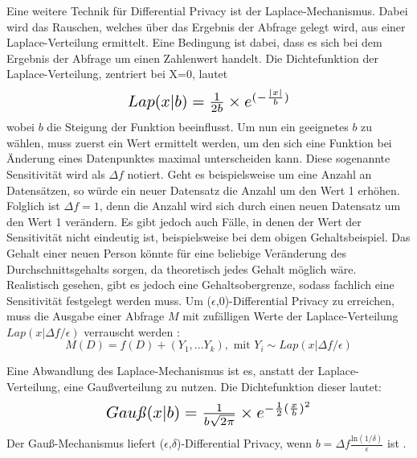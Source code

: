 Eine weitere Technik für Differential Privacy ist der Laplace-Mechanismus.
Dabei wird das Rauschen, welches über das Ergebnis der Abfrage gelegt wird, aus einer Laplace-Verteilung ermittelt.
Eine Bedingung ist dabei, dass es sich bei dem Ergebnis der Abfrage um einen Zahlenwert handelt.
Die Dichtefunktion der Laplace-Verteilung, zentriert bei X=0, lautet
\begin{equation}
\resizebox{!}{0.55cm}{$
    Lap(x|b) = \frac{1}{2b}\times e^{(-\frac{|x|}{b})}
$}
\end{equation}
wobei $b$ die Steigung der Funktion beeinflusst.
Um nun ein geeignetes $b$ zu wählen, muss zuerst ein Wert ermittelt werden, um den sich eine Funktion bei Änderung eines Datenpunktes maximal unterscheiden kann.
Diese sogenannte Sensitivität wird als $\Delta f$ notiert.
Geht es beispielsweise um eine Anzahl an Datensätzen, so würde ein neuer Datensatz die Anzahl um den Wert 1 erhöhen.
Folglich ist $\Delta f = 1$, denn die Anzahl wird sich durch einen neuen Datensatz um den Wert 1 verändern.
Es gibt jedoch auch Fälle, in denen der Wert der Sensitivität nicht eindeutig ist, beispielsweise bei dem obigen Gehaltsbeispiel.
Das Gehalt einer neuen Person könnte für eine beliebige Veränderung des Durchschnittsgehalts sorgen, da theoretisch jedes Gehalt möglich wäre.
Realistisch gesehen, gibt es jedoch eine Gehaltsobergrenze, sodass fachlich eine Sensitivität festgelegt werden muss.
Um ($\epsilon$,0)-Differential Privacy zu erreichen, muss die Ausgabe einer Abfrage $M$ mit zufälligen Werte der Laplace-Verteilung $Lap(x | \Delta f/\epsilon)$ verrauscht werden \cite{P-27}: 
\begin{equation}
    M(D) = f(D) + (Y_1, ... Y_k),\text{ mit } Y_i \sim Lap(x| \Delta f/\epsilon)
\end{equation}


Eine Abwandlung des Laplace-Mechanismus ist es, anstatt der Laplace-Verteilung, eine Gaußverteilung zu nutzen. Die Dichtefunktion dieser lautet:
\begin{equation}\label{formula:gauß}
\resizebox{!}{0.5cm}{$
    Gau\text{\textit{ß}}(x|b) = \frac{1}{b\sqrt{2\pi}}\times e^{-\frac{1}{2}(\frac{x}{b})^2}
$}
\end{equation}
Der Gauß-Mechanismus liefert ($\epsilon$,$\delta$)-Differential Privacy, wenn $b = \Delta f \frac{\text{ln}(1/\delta)}{\epsilon}$ ist \cite{P-27}.

